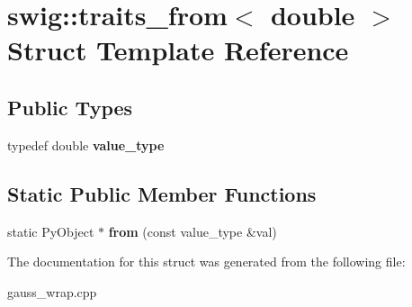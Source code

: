 \hypertarget{structswig_1_1traits__from_3_01double_01_4}{\section{swig\-:\-:traits\-\_\-from$<$ double $>$ Struct Template Reference}
\label{structswig_1_1traits__from_3_01double_01_4}
}
\subsection*{Public Types}
\begin{DoxyCompactItemize}
\item 
\hypertarget{structswig_1_1traits__from_3_01double_01_4_a91858e8bb1587ef10fc2c5e277abcc33}{typedef double {\bfseries value\-\_\-type}}\label{structswig_1_1traits__from_3_01double_01_4_a91858e8bb1587ef10fc2c5e277abcc33}

\end{DoxyCompactItemize}
\subsection*{Static Public Member Functions}
\begin{DoxyCompactItemize}
\item 
\hypertarget{structswig_1_1traits__from_3_01double_01_4_ae561b4392eb983662f203737585c2241}{static Py\-Object $\ast$ {\bfseries from} (const value\-\_\-type \&val)}\label{structswig_1_1traits__from_3_01double_01_4_ae561b4392eb983662f203737585c2241}

\end{DoxyCompactItemize}


The documentation for this struct was generated from the following file\-:\begin{DoxyCompactItemize}
\item 
gauss\-\_\-wrap.\-cpp\end{DoxyCompactItemize}
